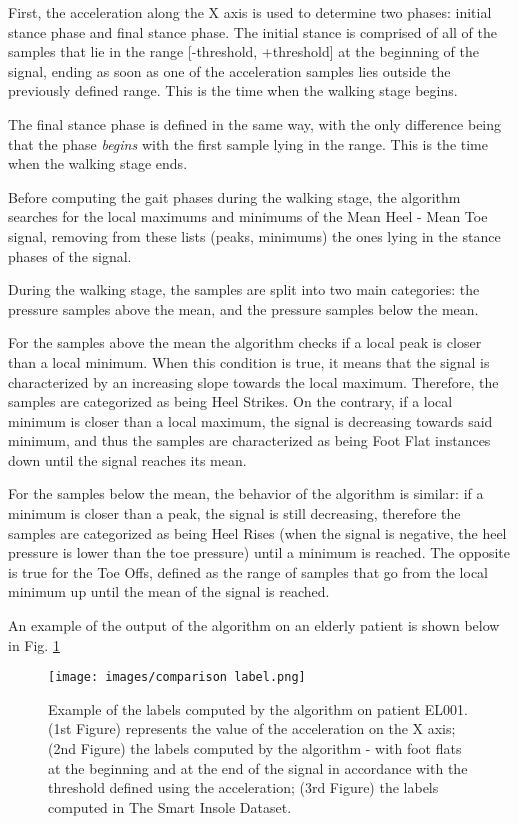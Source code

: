 First, the acceleration along the X axis is used to determine two phases: initial stance phase and final stance phase. The initial stance is comprised of all of the samples that lie in the range [-threshold, +threshold] at the beginning of the signal, ending as soon as one of the acceleration samples lies outside the previously defined range. This is the time when the walking stage begins. 

The final stance phase is defined in the same way, with the only difference being that the phase \textit{begins} with the first sample lying in the range. This is the time when the walking stage ends.

Before computing the gait phases during the walking stage, the algorithm searches for the local maximums and minimums of the Mean Heel - Mean Toe signal, removing from these lists (peaks, minimums) the ones lying in the stance phases of the signal.

During the walking stage, the samples are split into two main categories: the pressure samples above the mean, and the pressure samples below the mean. 

For the samples above the mean the algorithm checks if a local peak is closer than a local minimum. When this condition is true, it means that the signal is characterized by an increasing slope towards the local maximum. Therefore, the samples are categorized as being Heel Strikes. On the contrary, if a local minimum is closer than a local maximum, the signal is decreasing towards said minimum, and thus the samples are characterized as being Foot Flat instances down until the signal reaches its mean.

For the samples below the mean, the behavior of the algorithm is similar: if a minimum is closer than a peak, the signal is still decreasing, therefore the samples are categorized as being Heel Rises (when the signal is negative, the heel pressure is lower than the toe pressure) until a minimum is reached. The opposite is true for the Toe Offs, defined as the range of samples that go from the local minimum up until the mean of the signal is reached.

An example of the output of the algorithm on an elderly patient is shown below in Fig. \ref{fig:Example of the labels computed by the algorithm on patient EL001.}


\begin{figure}[ht!]
    \centering
    \texttt{[image: images/comparison label.png]}
    \caption{Example of the labels computed by the algorithm on patient EL001. (1st Figure) represents the value of the acceleration on the X axis; (2nd Figure) the labels computed by the algorithm - with foot flats at the beginning and at the end of the signal in accordance with the threshold defined using the acceleration; (3rd Figure) the labels computed in The Smart Insole Dataset.}
    \label{fig:Example of the labels computed by the algorithm on patient EL001.}
\end{figure}

